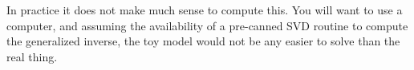 In practice it does not make much sense to compute this.  You will want to use a computer, and assuming the availability of a pre-canned SVD routine to compute the generalized inverse, the toy model would not be any easier to solve than the real thing.

%
%
%

